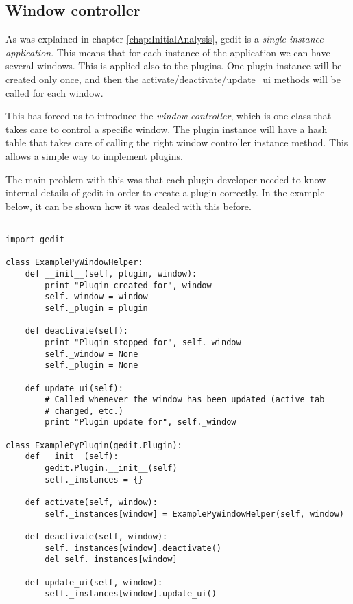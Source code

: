 \subsection{Window controller}\label{sec:WindowController}

As was explained in chapter \ref{chap:InitialAnalysis}, gedit is a \emph{single instance application}. This means that for each instance of the application we can have several windows. This is applied also to the plugins. One plugin instance will be created only once, and then the activate/deactivate/update\_ui methods will be called for each window.

This has forced us to introduce the \emph{window controller}, which is one class that takes care to control a specific window. The plugin instance will have a hash table that takes care of calling the right window controller instance method. This allows a simple way to implement plugins.

The main problem with this was that each plugin developer needed to know internal details of gedit in order to create a plugin correctly. In the example below, it can be shown how it was dealed with this before.

\begin{lstlisting}[style=python]

import gedit

class ExamplePyWindowHelper:
    def __init__(self, plugin, window):
        print "Plugin created for", window
        self._window = window
        self._plugin = plugin

    def deactivate(self):
        print "Plugin stopped for", self._window
        self._window = None
        self._plugin = None

    def update_ui(self):
        # Called whenever the window has been updated (active tab
        # changed, etc.)
        print "Plugin update for", self._window

class ExamplePyPlugin(gedit.Plugin):
    def __init__(self):
        gedit.Plugin.__init__(self)
        self._instances = {}

    def activate(self, window):
        self._instances[window] = ExamplePyWindowHelper(self, window)

    def deactivate(self, window):
        self._instances[window].deactivate()
        del self._instances[window]

    def update_ui(self, window):
        self._instances[window].update_ui()

\end{lstlisting}

